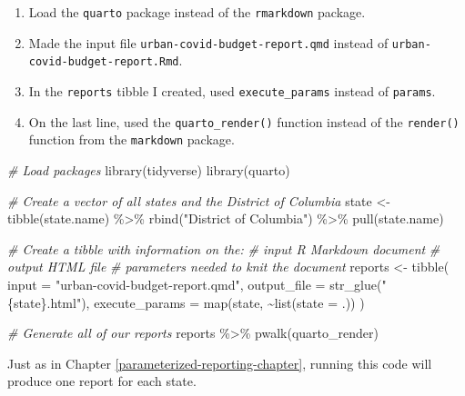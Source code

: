 \documentclass[
]{book}
\newenvironment{Shaded}{\begin{snugshade}}{\end{snugshade}}
\newcommand{\AttributeTok}[1]{\textcolor[rgb]{0.77,0.63,0.00}{#1}}
\newcommand{\CommentTok}[1]{\textcolor[rgb]{0.56,0.35,0.01}{\textit{#1}}}
\newcommand{\FunctionTok}[1]{\textcolor[rgb]{0.00,0.00,0.00}{#1}}
\newcommand{\NormalTok}[1]{#1}
\newcommand{\OtherTok}[1]{\textcolor[rgb]{0.56,0.35,0.01}{#1}}
\newcommand{\SpecialCharTok}[1]{\textcolor[rgb]{0.00,0.00,0.00}{#1}}
\newcommand{\StringTok}[1]{\textcolor[rgb]{0.31,0.60,0.02}{#1}}
\providecommand{\tightlist}{%
  \setlength{\itemsep}{0pt}\setlength{\parskip}{0pt}}
\begin{document}
\begin{enumerate}
\def\labelenumi{\arabic{enumi}.}
\tightlist
\item
  Load the \texttt{quarto} package instead of the \texttt{rmarkdown} package.
\item
  Made the input file \texttt{urban-covid-budget-report.qmd} instead of \texttt{urban-covid-budget-report.Rmd}.
\item
  In the \texttt{reports} tibble I created, used \texttt{execute\_params} instead of \texttt{params}.
\item
  On the last line, used the \texttt{quarto\_render()} function instead of the \texttt{render()} function from the \texttt{markdown} package.
\end{enumerate}

\begin{Shaded}
\begin{Highlighting}[]
\CommentTok{\# Load packages}
\FunctionTok{library}\NormalTok{(tidyverse)}
\FunctionTok{library}\NormalTok{(quarto)}

\CommentTok{\# Create a vector of all states and the District of Columbia}
\NormalTok{state }\OtherTok{\textless{}{-}} \FunctionTok{tibble}\NormalTok{(state.name) }\SpecialCharTok{\%\textgreater{}\%}
  \FunctionTok{rbind}\NormalTok{(}\StringTok{"District of Columbia"}\NormalTok{) }\SpecialCharTok{\%\textgreater{}\%} 
  \FunctionTok{pull}\NormalTok{(state.name)}

\CommentTok{\# Create a tibble with information on the:}
\CommentTok{\# input R Markdown document}
\CommentTok{\# output HTML file}
\CommentTok{\# parameters needed to knit the document}
\NormalTok{reports }\OtherTok{\textless{}{-}} \FunctionTok{tibble}\NormalTok{(}
  \AttributeTok{input =} \StringTok{"urban{-}covid{-}budget{-}report.qmd"}\NormalTok{,}
  \AttributeTok{output\_file =} \FunctionTok{str\_glue}\NormalTok{(}\StringTok{"\{state\}.html"}\NormalTok{),}
  \AttributeTok{execute\_params =} \FunctionTok{map}\NormalTok{(state, }\SpecialCharTok{\textasciitilde{}}\FunctionTok{list}\NormalTok{(}\AttributeTok{state =}\NormalTok{ .))}
\NormalTok{)}

\CommentTok{\# Generate all of our reports}
\NormalTok{reports }\SpecialCharTok{\%\textgreater{}\%}
  \FunctionTok{pwalk}\NormalTok{(quarto\_render)}
\end{Highlighting}
\end{Shaded}

Just as in Chapter \ref{parameterized-reporting-chapter}, running this code will produce one report for each state.
\end{document}
